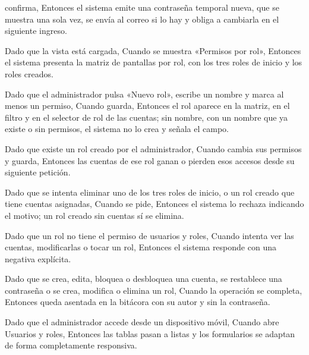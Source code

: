 {      confirma, Entonces el sistema emite una contraseña temporal nueva, que se muestra
      una sola vez, se envía al correo si lo hay y obliga a cambiarla en el siguiente
      ingreso.
\item Dado que la vista está cargada, Cuando se muestra «Permisos por rol», Entonces el
      sistema presenta la matriz de pantallas por rol, con los tres roles de inicio y los
      roles creados.
\item Dado que el administrador pulsa «Nuevo rol», escribe un nombre y marca al menos un
      permiso, Cuando guarda, Entonces el rol aparece en la matriz, en el filtro y en el
      selector de rol de las cuentas; sin nombre, con un nombre que ya existe o sin
      permisos, el sistema no lo crea y señala el campo.
\item Dado que existe un rol creado por el administrador, Cuando cambia sus permisos y
      guarda, Entonces las cuentas de ese rol ganan o pierden esos accesos desde su
      siguiente petición.
\item Dado que se intenta eliminar uno de los tres roles de inicio, o un rol creado que
      tiene cuentas asignadas, Cuando se pide, Entonces el sistema lo rechaza indicando el
      motivo; un rol creado sin cuentas sí se elimina.
\item Dado que un rol no tiene el permiso de usuarios y roles, Cuando intenta ver las
      cuentas, modificarlas o tocar un rol, Entonces el sistema responde con una negativa
      explícita.
\item Dado que se crea, edita, bloquea o desbloquea una cuenta, se restablece una
      contraseña o se crea, modifica o elimina un rol, Cuando la operación se completa,
      Entonces queda asentada en la bitácora con su autor y sin la contraseña.
\item Dado que el administrador accede desde un dispositivo móvil, Cuando abre Usuarios y
      roles, Entonces las tablas pasan a listas y los formularios se adaptan de forma
      completamente responsiva.}

